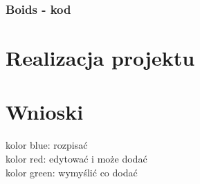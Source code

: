 \documentclass[a4paper,12pt,reqno]{article}
\begin{document}
\subsubsection{Boids - kod}





\section{Realizacja projektu}

\section{Wnioski}


\newpage




{\color{blue} kolor blue: rozpisać}\\
{\color{red} kolor red: edytować i może dodać}\\
{\color{green} kolor green: wymyślić co dodać}
\end{document}
